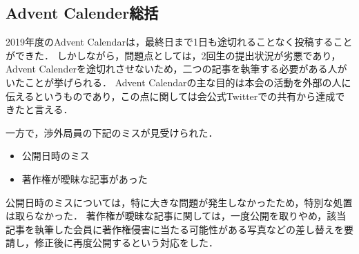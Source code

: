 \subsection*{Advent Calender総括}


2019年度のAdvent Calendarは，最終日まで1日も途切れることなく投稿することができた．
しかしながら，問題点としては，2回生の提出状況が劣悪であり，Advent Calenderを途切れさせないため，二つの記事を執筆する必要がある人がいたことが挙げられる．
Advent Calendarの主な目的は本会の活動を外部の人に伝えるというものであり，この点に関しては会公式Twitterでの共有から達成できたと言える．

一方で，渉外局員の下記のミスが見受けられた．
\begin{itemize}
\item 公開日時のミス
\item 著作権が曖昧な記事があった
\end{itemize}
公開日時のミスについては，特に大きな問題が発生しなかったため，特別な処置は取らなかった．
著作権が曖昧な記事に関しては，一度公開を取りやめ，該当記事を執筆した会員に著作権侵害に当たる可能性がある写真などの差し替えを要請し，修正後に再度公開するという対応をした．

